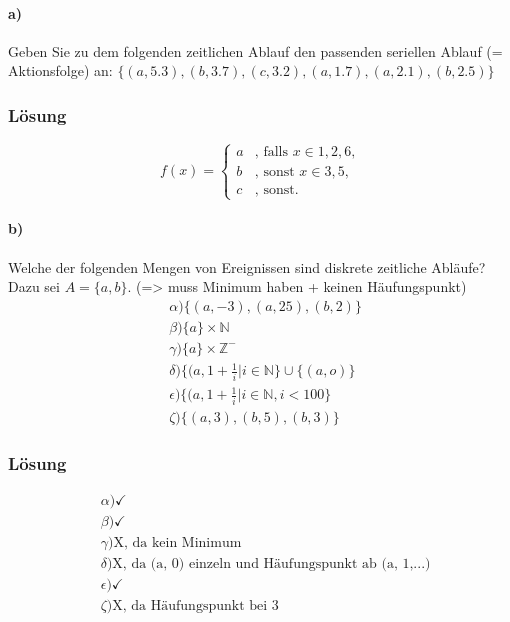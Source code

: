 \documentclass[a4paper]{scrartcl}
\begin{document}
\paragraph{a)} Geben Sie zu dem folgenden zeitlichen Ablauf den passenden seriellen Ablauf (= Aktionsfolge) an:
$ \{(a, 5.3), (b, 3.7), (c, 3.2), (a, 1.7), (a, 2.1), (b, 2.5)\}$

\subsubsection*{Lösung}
\begin{equation*}
\ f(x) = 
\begin{cases}
a & \text{, falls } x \in {1,2,6},\\
b & \text{, sonst } x \in {3,5},\\
c & \text{, sonst.}
\end{cases}
\end{equation*}

\paragraph{b)} Welche der folgenden Mengen von Ereignissen sind diskrete zeitliche Abläufe? Dazu sei $ A = \{a, b\} $.  
(=> muss Minimum haben + keinen Häufungspunkt)
\begin{align*}
& \alpha ) \{ (a, -3), (a, 25), (b, 2) \} \\
& \beta ) \{ a \} \times \mathbb{N} \\
& \gamma ) \{ a \} \times \mathbb{Z}^- \\
& \delta ) \{ (a, 1+ \frac{1}{i} | i \in \mathbb{N} \} \cup \{ (a, o ) \} \\
& \epsilon ) \{ (a, 1+ \frac{1}{i} | i \in \mathbb{N} , i < 100 \} \\
& \zeta ) \{ (a, 3), (b, 5), (b, 3) \}
\end{align*}
 
\subsubsection*{Lösung}
\begin{align*}
& \alpha ) \checkmark \\
& \beta ) \checkmark\\
& \gamma ) \text{X} \text{, da kein Minimum} \\
& \delta ) \text{X} \text{, da (a, 0) einzeln und Häufungspunkt ab (a, 1,...)} \\
& \epsilon ) \checkmark \\
& \zeta ) \text{X} \text{, da Häufungspunkt bei 3} \\
\end{align*}
\end{document}
